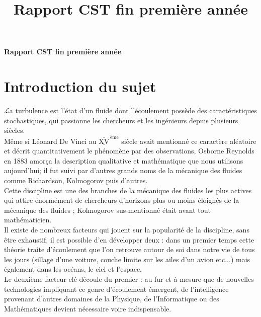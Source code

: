 \documentclass[a4paper,12pt]{article}
\title{\navy \textbf{Rapport CST fin première année} \color{black}}%
\date{}
\newcommand\bk{\color{black}}
\newcommand\navy{\color{navy}}
\numberwithin{equation}{section} %
\begin{document}
\begin{titlepage} \centering
\vspace*{\fill}
\Huge \navy \textbf{Rapport CST fin première année} \bk \normalsize
\vspace*{\fill}
\end{titlepage}
\newpage

\section{Introduction du sujet} 
\Large{$\mathscr{L}$}\normalsize a turbulence est l'état d'un fluide dont l'écoulement possède des caractéristiques stochastiques, qui passionne les chercheurs et les ingénieurs depuis plusieurs siècles.\\ 
Même si Léonard De Vinci au $\overline{\underline{\text{XV}}}^{\, \text{ème}}$ siècle avait mentionné ce caractère aléatoire et décrit quantitativement le phénomène par des observations, Osborne Reynolds en 1883 amorça la description qualitative et mathématique que nous utilisons aujourd'hui; il fut suivi par d'autres grands noms de la mécanique des fluides comme Richardson, Kolmogorov puis d'autres. \\

\noindent Cette discipline est une des branches de la mécanique des fluides les plus actives qui attire énormément de chercheurs d'horizons plus ou moins éloignés de la mécanique des fluides ; Kolmogorov sus-mentionné était avant tout mathématicien.\\
Il existe de nombreux facteurs qui jouent sur la popularité de la discipline, sans être exhaustif, il est possible d'en développer deux : dans un premier temps cette théorie traite d'écoulement que l'on retrouve autour de soi dans notre vie de tous les jours (sillage d'une voiture, couche limite sur les ailes d'un avion etc...) mais également dans les océans, le ciel et l'espace. \\
Le deuxième facteur clé découle du premier : au fur et à mesure que de nouvelles technologies impliquant ce genre d'écoulement émergent, de l'intelligence provenant d'autres domaines de la Physique, de l'Informatique ou des Mathématiques devient nécessaire voire indispensable. \\
\end{document}
